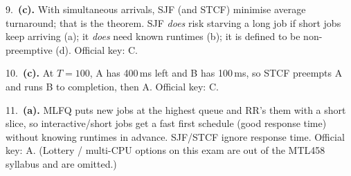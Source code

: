\documentclass[11pt,a4paper]{article}
\newenvironment{Sol}{%
  \begin{tcolorbox}[sboxstyle, title={Solution}]%
}{%
  \end{tcolorbox}\vspace{0.35em}%
}
\begin{document}
\begin{Sol}
9.\ \textbf{(c).} With simultaneous arrivals, SJF (and STCF) minimise average turnaround; that is the theorem. SJF \emph{does} risk starving a long job if short jobs keep arriving (a); it \emph{does} need known runtimes (b); it is defined to be non-preemptive (d). Official key: C.

10.\ \textbf{(c).} At $T=100$, A has 400\,ms left and B has 100\,ms, so STCF preempts A and runs B to completion, then A. Official key: C.

11.\ \textbf{(a).} MLFQ puts new jobs at the highest queue and RR's them with a short slice, so interactive/short jobs get a fast first schedule (good response time) without knowing runtimes in advance. SJF/STCF ignore response time. Official key: A. (Lottery / multi-CPU options on this exam are out of the MTL458 syllabus and are omitted.)
\end{Sol}
\end{document}
